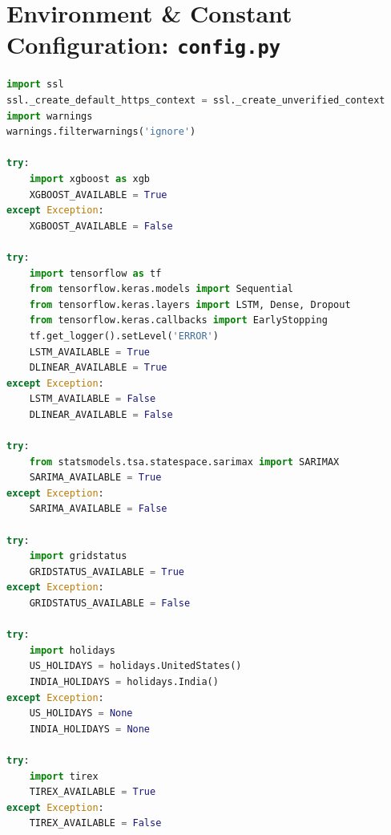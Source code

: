 \documentclass[12pt,a4paper,twoside,fleqn]{report}
\begin{document}
\section{Environment & Constant Configuration: \texttt{config.py}}
\begin{lstlisting}[language=Python, basicstyle=\ttfamily\tiny, breaklines=true]
import ssl
ssl._create_default_https_context = ssl._create_unverified_context
import warnings
warnings.filterwarnings('ignore')

try:
    import xgboost as xgb
    XGBOOST_AVAILABLE = True
except Exception:
    XGBOOST_AVAILABLE = False

try:
    import tensorflow as tf
    from tensorflow.keras.models import Sequential
    from tensorflow.keras.layers import LSTM, Dense, Dropout
    from tensorflow.keras.callbacks import EarlyStopping
    tf.get_logger().setLevel('ERROR')
    LSTM_AVAILABLE = True
    DLINEAR_AVAILABLE = True
except Exception:
    LSTM_AVAILABLE = False
    DLINEAR_AVAILABLE = False

try:
    from statsmodels.tsa.statespace.sarimax import SARIMAX
    SARIMA_AVAILABLE = True
except Exception:
    SARIMA_AVAILABLE = False

try:
    import gridstatus
    GRIDSTATUS_AVAILABLE = True
except Exception:
    GRIDSTATUS_AVAILABLE = False

try:
    import holidays
    US_HOLIDAYS = holidays.UnitedStates()
    INDIA_HOLIDAYS = holidays.India()
except Exception:
    US_HOLIDAYS = None
    INDIA_HOLIDAYS = None

try:
    import tirex
    TIREX_AVAILABLE = True
except Exception:
    TIREX_AVAILABLE = False




\end{lstlisting}
\end{document}
